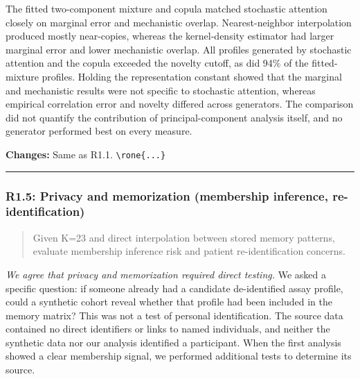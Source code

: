 \documentclass[
  11pt,
  letterpaper,
]{article}
\begin{document}
The fitted two-component mixture and copula matched stochastic attention closely on marginal error and mechanistic overlap. Nearest-neighbor interpolation produced mostly near-copies, whereas the kernel-density estimator had larger marginal error and lower mechanistic overlap. All profiles generated by stochastic attention and the copula exceeded the novelty cutoff, as did 94\% of the fitted-mixture profiles. Holding the representation constant showed that the marginal and mechanistic results were not specific to stochastic attention, whereas empirical correlation error and novelty differed across generators. The comparison did not quantify the contribution of principal-component analysis itself, and no generator performed best on every measure.

\textbf{Changes:} Same as R1.1. \texttt{\textbackslash{}rone\{...\}}

\begin{center}\rule{0.5\linewidth}{0.5pt}\end{center}

\subsubsection{R1.5: Privacy and memorization (membership inference, re-identification)}\label{r15-privacy-and-memorization-membership-inference-re-identification}

\begin{quote}
Given K=23 and direct interpolation between stored memory patterns, evaluate membership inference risk and patient re-identification concerns.
\end{quote}

\emph{We agree that privacy and memorization required direct testing.} We asked a specific question: if someone already had a candidate de-identified assay profile, could a synthetic cohort reveal whether that profile had been included in the memory matrix? This was not a test of personal identification. The source data contained no direct identifiers or links to named individuals, and neither the synthetic data nor our analysis identified a participant. When the first analysis showed a clear membership signal, we performed additional tests to determine its source.
\end{document}

